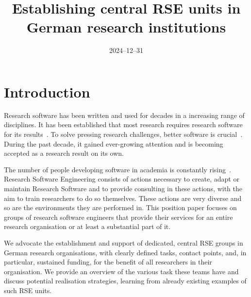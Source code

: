 \documentclass[a4paper]{article}
\title{Establishing central RSE units in German research institutions}
\date{2024--12--31}
\begin{document}
\maketitle

\section{Introduction}
Research software has been written and used for decades in a increasing range of disciplines.
It has been established that most research requires research software for its results~\autocite{Hannay2009, Hettrick2015}.
To solve pressing research challenges, better software is crucial~\autocite{Goble2014}.
During the past decade, it gained ever-growing attention and is becoming accepted as a research result on its own.

The number of people developing software in academia is constantly rising~\autocite{Hannay2009, Hettrick2015}.
Research Software Engineering consists of actions necessary to create, adapt or maintain Research Software and to provide consulting in these actions, with the aim to train researchers to do so themselves.
These actions are very diverse and so are the environments they are performed in.
This position paper focuses on groups of research software engineers that provide their services for an entire research organisation or at least a substantial part of it.

We advocate the establishment and support of dedicated, central RSE groups in German research organisations, with clearly defined tasks, contact points, and, in particular, sustained funding, for the benefit of all researchers in their organisation.
We provide an overview of the various task these teams have and discuss potential realisation strategies, learning from already existing examples of such RSE units.
\end{document}
